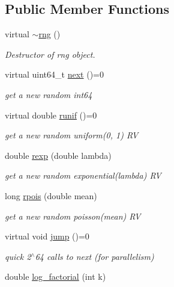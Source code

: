 \subsection*{Public Member Functions}
\begin{DoxyCompactItemize}
\item 
\mbox{\label{classrng_acc0ef5e0bf2bee28c37070ddb4c21175}} 
virtual \hyperlink{classrng_acc0ef5e0bf2bee28c37070ddb4c21175}{$\sim$rng} ()
\begin{DoxyCompactList}\small\item\em Destructor of rng object. \end{DoxyCompactList}\item 
\mbox{\label{classrng_a0fa7d2415b07e3396b6ed3fb7c238606}} 
virtual uint64\+\_\+t \hyperlink{classrng_a0fa7d2415b07e3396b6ed3fb7c238606}{next} ()=0
\begin{DoxyCompactList}\small\item\em get a new random int64 \end{DoxyCompactList}\item 
\mbox{\label{classrng_a3f0fec3ad9a286726825fddbf78aada8}} 
virtual double \hyperlink{classrng_a3f0fec3ad9a286726825fddbf78aada8}{runif} ()=0
\begin{DoxyCompactList}\small\item\em get a new random uniform(0, 1) RV \end{DoxyCompactList}\item 
\mbox{\label{classrng_a7770e4ceae3bad5c426784b4b2148a1d}} 
double \hyperlink{classrng_a7770e4ceae3bad5c426784b4b2148a1d}{rexp} (double lambda)
\begin{DoxyCompactList}\small\item\em get a new random exponential(lambda) RV \end{DoxyCompactList}\item 
\mbox{\label{classrng_a9c16bdeae3be90e8bd30eb284a4b2980}} 
long \hyperlink{classrng_a9c16bdeae3be90e8bd30eb284a4b2980}{rpois} (double mean)
\begin{DoxyCompactList}\small\item\em get a new random poisson(mean) RV \end{DoxyCompactList}\item 
\mbox{\label{classrng_a2203fb1d2504c000306be5a0035d1a6c}} 
virtual void \hyperlink{classrng_a2203fb1d2504c000306be5a0035d1a6c}{jump} ()=0
\begin{DoxyCompactList}\small\item\em quick 2$^\wedge$64 calls to next (for parallelism) \end{DoxyCompactList}\item 
double \hyperlink{classrng_ae85750e7f1befc4d1016731248dd3e80}{log\+\_\+factorial} (int k)
\end{DoxyCompactItemize}
